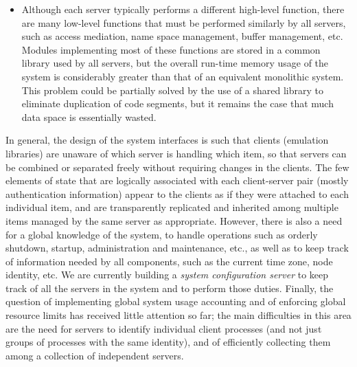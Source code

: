 \begin{itemize}
\item Although each server typically performs a different high-level
function, there are many low-level functions that must be performed
similarly by all servers, such as access mediation, name space
management, buffer management, etc. Modules implementing most of these
functions are stored in a common library used by all servers, but the
overall run-time memory usage of the system is considerably greater
than that of an equivalent monolithic system.  This problem could be
partially solved by the use of a shared library to eliminate
duplication of code segments, but it remains the case that much data
space is essentially wasted.

\end{itemize}

In general, the design of the system interfaces is such that clients
(emulation libraries) are unaware of which server is handling which
item, so that servers can be combined or separated freely without
requiring changes in the clients. The few elements of state that are
logically associated with each client-server pair (mostly
authentication information) appear to the clients as if they were
attached to each individual item, and are transparently replicated and
inherited among multiple items managed by the same server as
appropriate.  However, there is also a need for a global knowledge of
the system, to handle operations such as orderly shutdown, startup,
administration and maintenance, etc., as well as to keep track of
information needed by all components, such as the current time zone,
node identity, etc.  We are currently building a {\em system
configuration server} to keep track of all the servers in the system
and to perform those duties.  Finally, the question of implementing
global system usage accounting and of enforcing global resource limits
has received little attention so far; the main difficulties in this
area are the need for servers to identify individual client processes
(and not just groups of processes with the same identity), and of
efficiently collecting them among a collection of independent servers.

